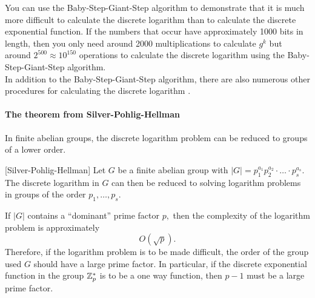 You can use the Baby-Step-Giant-Step algorithm to demonstrate that it is much 
more difficult to calculate the discrete logarithm than to calculate the 
discrete exponential function. If the numbers that occur have approximately 1000 
bits in length, then you only need around 2000 multiplications to calculate $ 
g^k $ but around $ 2^{500} \approx 10^{150} $ operations to calculate the 
discrete logarithm using the Baby-Step-Giant-Step algorithm. \\
In addition to the Baby-Step-Giant-Step algorithm, there are also numerous other 
procedures for calculating the discrete logarithm \cite{4Stinson1995}.

\paragraph{The theorem from Silver-Pohlig-Hellman}
In finite abelian groups, the discrete logarithm problem can be reduced to 
groups of a lower order.
\begin{theorem}\label{thm-cry-pohe}[Silver-Pohlig-Hellman]
Let $ G $ be a finite abelian group with $ |G|= p_1^{a_1} p_2^{a_2} \cdot \ldots 
\cdot p_s^{a_s}. $ The discrete logarithm in $ G $ can then be reduced to 
solving logarithm problems in groups of the order $ p_1, \ldots , p_s $.
\end{theorem}

If $ |G| $ contains a ``dominant'' prime factor $ p ,$ then the 
complexity  of the logarithm problem is approximately
\[ O(\sqrt{p}). \]
Therefore, if the logarithm problem is to be made difficult, the order of the 
group used $ G $ should have a large prime factor. In particular, if the 
discrete exponential function in the group $ \mathbf{\mathbb{Z}}_p^{\ast} $ is to be a one way 
function, then $ p -1 $ must be a large prime factor.




\begin{center}
\end{center}



